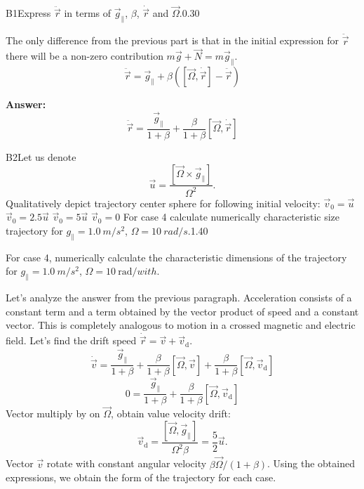 \documentclass[11pt,a4paper]{article}
\begin{document}
\begin{solcard}{B1}{Express $\ddot{\vec r}$ in terms of $\vec g_\parallel$, $\beta$, $\dot{\vec r}$ and $\vec \Omega$.}{0.30}

The only difference from the previous part is that in the initial expression for $\ddot{\vec r}$ there will be a non-zero contribution $m\vec g + \vec N = m\vec g_\parallel$. $$\ddot{\vec r} = \vec g_\parallel+\beta\left(\left[\vec\Omega,\dot{\vec r}\right]-\ddot{\vec r}\right)$$

\par\smallskip\noindent\textbf{Answer:} $$ \ddot{\vec r} = \frac{\vec g_\parallel}{1+\beta}+\frac{\beta}{1+\beta}\left[\vec\Omega,\dot{\vec r}\right] $$
\end{solcard}

\begin{solcard}{B2}{Let us denote $$\vec{u} = \frac{\left[\vec{\Omega} \times \vec g_\parallel\right]}{\Omega^2}.$$ Qualitatively depict trajectory center sphere for following initial velocity: $\vec{v}_0 = \vec{u}$ $\vec{v}_0 = 2.5 \vec{u}$ $\vec{v}_0 = 5 \vec{u}$ $\vec{v}_0 = 0$ For case 4 calculate numerically characteristic size trajectory for $g_\parallel=1.0~m/s^2$, $\Omega = 10~rad/s$.}{1.40}

For case 4, numerically calculate the characteristic dimensions of the trajectory for $g_\parallel=1.0~m/s^2$, $\Omega = 10~\mathrm{rad}/with$.


Let's analyze the answer from the previous paragraph. Acceleration consists of a constant term and a term obtained by the vector product of speed and a constant vector. This is completely analogous to motion in a crossed magnetic and electric field. Let's find the drift speed $\dot{\vec r} = \vec v + \vec v_\text{d}$. $$ \dot{\vec v} = \frac{\vec g_\parallel}{1+\beta}+\frac{\beta}{1+\beta}\left[\vec\Omega,\vec v\right]+\frac{\beta}{1+\beta}\left[\vec\Omega,\vec v_\text{d}\right] $$$$ 0 = \frac{\vec g_\parallel}{1+\beta}+\frac{\beta}{1+\beta}\left[\vec\Omega,\vec v_\text{d}\right] $$Vector multiply by on $\vec\Omega$, obtain value velocity drift: $$ \vec v_\text{d} = \frac{\left[\vec \Omega, \vec g_\parallel\right]}{\Omega^2\beta} = \frac{5}{2}\vec u. $$Vector $\vec v$ rotate with constant angular velocity $\beta \vec\Omega/(1+\beta)$. Using the obtained expressions, we obtain the form of the trajectory for each case.


\end{solcard}
\end{document}
